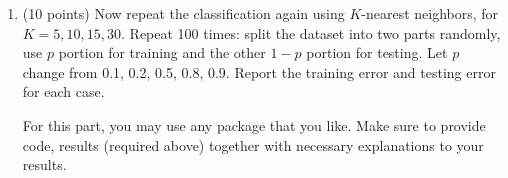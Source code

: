 \documentclass[a4paper,12pt,fleqn]{article}
\begin{document}
\begin{enumerate}
\item (10 points) Now repeat the classification again using $K$-nearest neighbors, for $K = 5, 10, 15, 30$.  Repeat 100 times: split the dataset into two parts randomly, use $p$ portion for training and the other $1 - p$ portion for testing. Let $p$ change from 0.1, 0.2, 0.5, 0.8, 0.9. Report the training error and testing error for each case.

For this part, you may use any package that you like.  Make sure to provide code, results (required above) together with necessary explanations to your results. 

\end{enumerate}


\label{finalpage}
\end{document}
